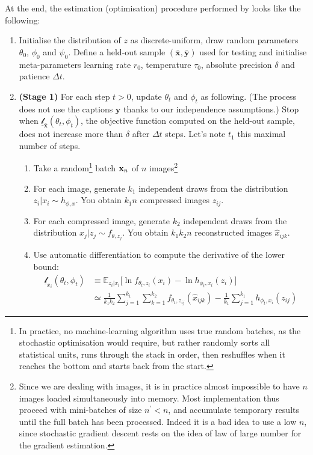 \documentclass{article}
\begin{document}
\begin{appendix}
At the end, the estimation (optimisation) procedure performed by \cite{zeroshot} looks like the following:

\newcommand{\zn}{\mathbf{z}_n}

\begin{enumerate}
    \item Initialise the distribution of $z$ as discrete-uniform, draw random parameters $\theta_0$,  $\phi_0$ and $\psi_0$. Define a held-out sample $(\bar{\mathbf{x}},\bar{\mathbf{y}})$ used for testing and initialise meta-parameters learning rate $r_0$, temperature $\tau_0$, absolute precision $\delta$ and patience $\Delta t$.
    \item \textbf{(Stage 1)} For each step $t>0$, update $\theta_t$ and $\phi_t$ as following. (The process does not use the captions $\mathbf{y}$ thanks to our independence assumptions.) Stop when $\underline{\mathscr{l}}_{\bar{\mathbf{x}}}(\theta_t,\phi_t)$, the objective function computed on the held-out sample, does not increase more than $\delta$ after $\Delta t$ steps. Let's note $t_1$ this maximal number of steps.
    \begin{enumerate}
    \item Take a random\footnote{In practice, no machine-learning algorithm uses true random batches, as the stochastic optimisation would require, but rather randomly sorts all statistical units, runs through the stack in order, then reshuffles when it reaches the bottom and starts back from the start.} batch $\mathbf{x}_n$ of $n$ images\footnote{Since we are dealing with images, it is in practice almost impossible to have $n$ images loaded simultaneously into memory. Most implementation thus proceed with mini-batches of size $n^\prime<n$, and accumulate temporary results until the full batch has been processed. Indeed it is a bad idea to use a low $n$, since stochastic gradient descent rests on the idea of law of large number for the gradient estimation.}
    \item For each image, generate $k_1$ independent draws from the distribution $z_i|x_i\sim h_{\phi,x}$. You obtain $k_1n$ compressed images $z_{ij}$.
    \item For each compressed image, generate $k_2$ independent draws from the distribution $x_j|z_j\sim f_{\theta,z_j}$. You obtain $k_1k_2n$ reconstructed images $\hat x_{ijk}$.
    \item Use automatic differentiation to compute the derivative of the lower bound: \begin{align*}
    \underline{\mathscr{l}}_{x_i}(\theta_{t},\phi_{t}) & \equiv \mathbb{E}_{z_i|x_i} \Big[\ln f_{\theta_t,z_i}(x_i) -\ln h_{\phi_t,x_i}(z_i)\Big] \\ & \simeq \frac{1}{k_1k_2}\sum_{j=1}^{k_1}\sum_{k=1}^{k_2} f_{ \theta_t,z_{ij}}( \hat{x}_{ijk} )-\frac{1}{k_1}\sum_{j=1}^{k_1} h_{\phi_t,x_i}(z_{ij})

\end{align*}
\end{enumerate}
\end{enumerate}
\end{appendix}
\end{document}
